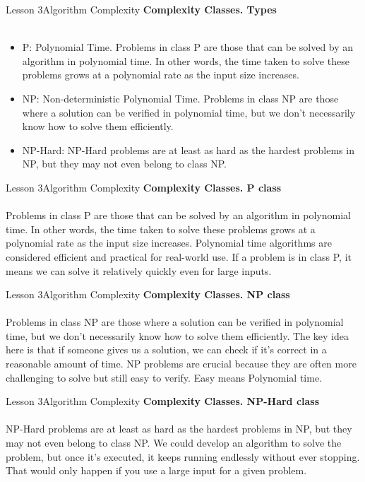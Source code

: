 \documentclass[aspectratio=1610]{beamer}
\begin{document}
\begin{frame}{Lesson 3}{Algorithm Complexity}
\LARGE
\textbf{Complexity Classes. Types}\\~\\
\Large
\begin{itemize}
	\item P: Polynomial Time. Problems in class P are those that can be solved by an algorithm in polynomial time. In other words, the time taken to solve these problems grows at a polynomial rate as the input size increases.
	\item NP: Non-deterministic Polynomial Time. Problems in class NP are those where a solution can be verified in polynomial time, but we don’t necessarily know how to solve them efficiently.	
    \item NP-Hard: NP-Hard problems are at least as hard as the hardest problems in NP, but they may not even belong to class NP.
\end{itemize}
\end{frame}


\begin{frame}{Lesson 3}{Algorithm Complexity}
\LARGE
\textbf{Complexity Classes. P class}\\~\\
\Large
Problems in class P are those that can be solved by an algorithm in polynomial
time. In other words, the time taken to solve these problems grows at a polynomial
rate as the input size increases. Polynomial time algorithms are considered
efficient and practical for real-world use. If a problem is in class P, it means
we can solve it relatively quickly even for large inputs.
\end{frame}


\begin{frame}{Lesson 3}{Algorithm Complexity}
\LARGE
\textbf{Complexity Classes. NP class}\\~\\
\Large
Problems in class NP are those where a solution can be verified in polynomial
time, but we don’t necessarily know how to solve them efficiently. The key idea
here is that if someone gives us a solution, we can check if it’s correct in a
reasonable amount of time. NP problems are crucial because they are often more
challenging to solve but still easy to verify. Easy means Polynomial time.
\end{frame}


\begin{frame}{Lesson 3}{Algorithm Complexity}
\LARGE
\textbf{Complexity Classes. NP-Hard class}\\~\\
\Large
NP-Hard problems are at least as hard as the hardest problems in NP, but they may not
even belong to class NP. We could develop an algorithm to solve the problem, but once
it’s executed, it keeps running endlessly without ever stopping. That would only
happen if you use a large input for a given problem.
\end{frame}
\end{document}
